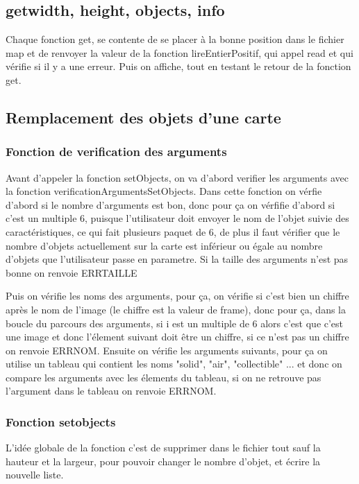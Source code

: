 \documentclass[10pt,a4paper]{article}
\begin{document}
\subsection{getwidth, height, objects, info}
    Chaque fonction get, se contente de se placer à la bonne position dans le fichier map et de renvoyer la valeur de la fonction lireEntierPositif, qui appel read et qui vérifie si il y a une erreur. Puis on affiche, tout en testant le retour de la fonction get. 
\subsection{Remplacement des objets d'une carte}
        \subsubsection{Fonction de verification des arguments}
            Avant d'appeler la fonction setObjects, on va d'abord verifier les arguments avec la fonction verificationArgumentsSetObjects.
            Dans cette fonction on vérfie d'abord si le nombre d'arguments est bon, donc pour ça on vérfifie d'abord si c'est un multiple 6, puisque l'utilisateur doit envoyer le nom de l'objet suivie des caractéristiques, ce qui fait plusieurs paquet de 6, de plus il faut vérifier que le nombre d'objets actuellement sur la carte est inférieur ou égale au nombre d'objets que l'utilisateur passe en parametre. Si la taille des arguments n'est pas bonne on renvoie ERRTAILLE
            
            Puis on vérifie les noms des arguments, pour ça, on vérifie si c'est bien un chiffre après le nom de l'image (le chiffre est la valeur de frame), donc pour ça, dans la boucle du parcours des arguments, si i est un multiple de 6 alors c'est que c'est une image et donc l'élement suivant doit être un chiffre, si ce n'est pas un chiffre on renvoie ERRNOM.
            Ensuite on vérifie les arguments suivants, pour ça on utilise un tableau qui contient les noms "solid", "air", "collectible" ... et donc on compare les arguments avec les élements du tableau, si on ne retrouve pas l'argument dans le tableau on renvoie ERRNOM.
            
        \subsubsection{Fonction setobjects}
            L'idée globale de la fonction c'est de supprimer dans le fichier tout sauf la hauteur et la largeur, pour pouvoir changer le nombre d'objet, et écrire la nouvelle liste.
            
\end{document}
